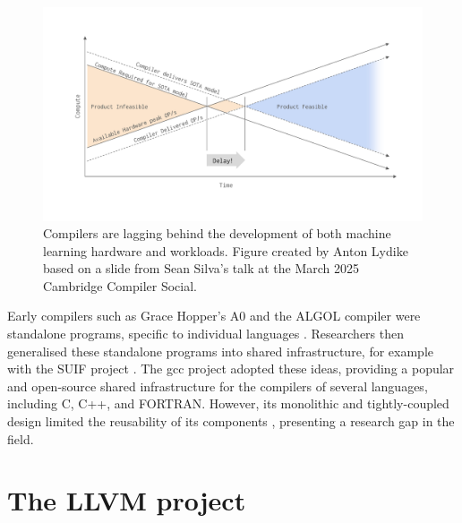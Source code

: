 \begin{figure}[H]
    \centering
    \includegraphics[width=\textwidth]{images/background/compilers_lagging.pdf}
    \caption{Compilers are lagging behind the development of both machine learning hardware and workloads. Figure created by Anton Lydike based on a slide from Sean Silva's talk at the March 2025 Cambridge Compiler Social.}
    \label{fig:compilers-lagging}
\end{figure}

Early compilers such as Grace Hopper's A0 and the ALGOL compiler were standalone programs, specific to individual languages \cite{knuthEarlyDevelopmentProgramming1980}.
Researchers then generalised these standalone programs into shared infrastructure, for example with the SUIF project \cite{wilsonSUIFInfrastructureResearch1994}.
The \ac{gcc} project adopted these ideas, providing a popular and open-source shared infrastructure for the compilers of several languages, including C, C++, and FORTRAN. However, its monolithic and tightly-coupled design limited the reusability of its components \cite{stallmanUsingGnuCompiler2009}, presenting a research gap in the field.

\section{The LLVM project}
\label{sec:llvm}

